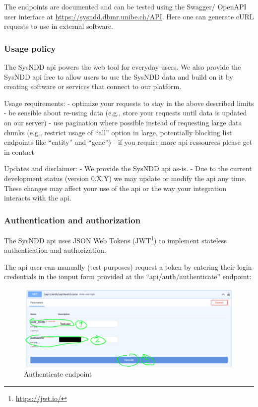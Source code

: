 \documentclass[
]{article}
\renewcommand{\href}[2]{#2\footnote{\url{#1}}}
\begin{document}
The endpoints are documented and can be tested using the Swagger/ OpenAPI user interface at \url{https://sysndd.dbmr.unibe.ch/API}.
Here one can generate cURL requests to use in external software.

\hypertarget{usage-policy}{%
\subsubsection{Usage policy}\label{usage-policy}}

The SysNDD api powers the web tool for everyday users. We also provide the SysNDD api free to allow users to use the SysNDD data and build on it by creating software or services that connect to our platform.

Usage requirements:
- optimize your requests to stay in the above described limits
- be sensible about re-using data (e.g., store your requests until data is updated on our server)
- use pagination where possible instead of requesting large data chunks (e.g., restrict usage of ``all'' option in large, potentially blocking list endpoints like ``entity'' and ``gene'')
- if you require more api ressources please get in contact

Updates and disclaimer:
- We provide the SysNDD api as-is.
- Due to the current development status (version 0.X.Y) we may update or modify the api any time. These changes may affect your use of the api or the way your integration interacts with the api.

\hypertarget{authentication-and-authorization}{%
\subsubsection{Authentication and authorization}\label{authentication-and-authorization}}

The SysNDD api uses JSON Web Tokens (\href{https://jwt.io/}{JWT}) to implement stateless authentication and authorization.

The api user can manually (test purposes) request a token by entering their login credentials in the ionput form provided at the ``api/auth/authenticate'' endpoint:

\begin{figure}
\centering
\includegraphics{./static/img/03_01-api-authenticate.png}
\caption{Authenticate endpoint}
\end{figure}
\end{document}
